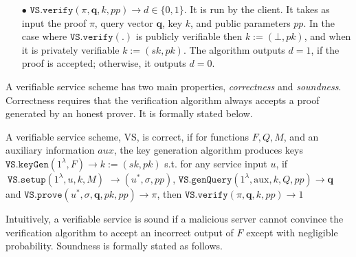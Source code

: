 \begin{definition}[VS Scheme]
\begin{itemize}
\

\item[$\bullet$] $\mathtt{VS.verify}(\pi, \bm{q}, k, {pp})\rightarrow d\in\{0,1\}$. It is run by the client. It takes as input the proof $\pi$,   query vector $\bm{q}$,   key  $k$, and {public parameters $pp$}.   In the case where $\mathtt{VS.verify}(.)$ is publicly verifiable then $k:=(\bot,pk)$,  and when it is privately verifiable $k:=(sk,pk)$. The algorithm  outputs $d=1$, if the proof is accepted; otherwise, it outputs $d=0$. 



\end{itemize}
\end{definition}


A verifiable service scheme has two main properties, \emph{correctness} and \emph{soundness}. Correctness requires that  the verification algorithm always accepts a proof generated by an honest prover.  It is formally stated below.

\begin{definition}[VS Correctness] A verifiable service scheme, VS, is  correct,  if for functions $F,Q,M$, and an auxiliary information $aux$, the key generation algorithm produces keys $\mathtt{VS.keyGen}(1^{\lambda},F)\rightarrow k:=(sk,pk)$ s.t. for any service input $u$, if $\ \mathtt{VS.setup}(1^{\lambda}, u,k,M)$ $\rightarrow (u^{\scriptscriptstyle *},\sigma, {pp})$,  $\mathtt{VS.genQuery}(1^{\lambda}, \text{aux},k,Q, {pp})\rightarrow \bm{q}$ and $\mathtt{VS.prove}(u^{\scriptscriptstyle *},\sigma, \bm{q},pk, {pp})\rightarrow \pi$, then $\mathtt{VS.verify}(\pi, \bm{q}, k, {pp})\rightarrow 1$
\end{definition}

Intuitively, a verifiable service is sound  if a malicious server cannot convince the verification algorithm to accept an incorrect output of $F$ except with negligible probability. Soundness is formally stated as follows.




